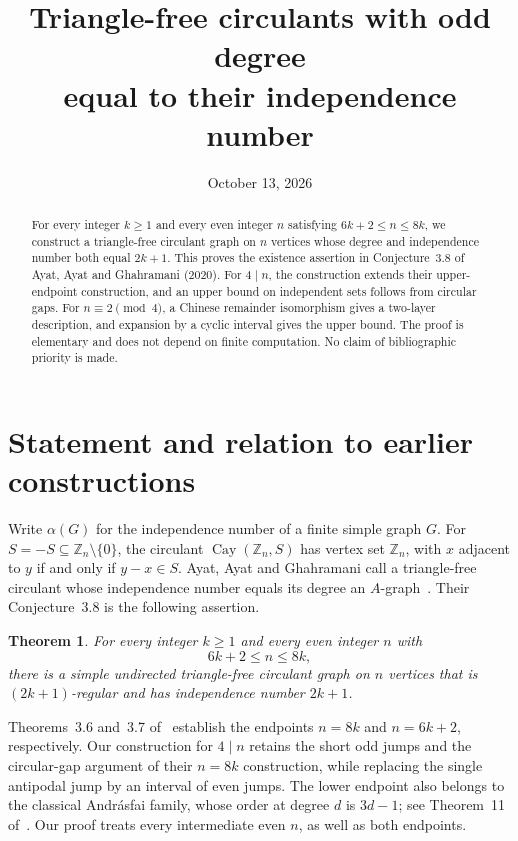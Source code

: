 \documentclass[11pt]{article}
\title{Triangle-free circulants with odd degree\\equal to their independence number}
\author{}
\date{October 13, 2026}
\newtheorem{theorem}{Theorem}
\newcommand{\Z}{\mathbb Z}
\newcommand{\Cay}{\operatorname{Cay}}
\begin{document}
\maketitle
\begin{abstract}
For every integer \(k\ge1\) and every even integer \(n\) satisfying
\(6k+2\le n\le8k\), we construct a triangle-free circulant graph on \(n\)
vertices whose degree and independence number both equal \(2k+1\).
This proves the existence assertion in Conjecture~3.8 of
Ayat, Ayat and Ghahramani (2020).
For \(4\mid n\), the construction extends their upper-endpoint construction,
and an upper bound on independent sets follows from circular gaps.
For \(n\equiv2\pmod4\), a Chinese remainder isomorphism gives a two-layer
description, and expansion by a cyclic interval gives the upper bound.
The proof is elementary and does not depend on finite computation.
No claim of bibliographic priority is made.
\end{abstract}

\section{Statement and relation to earlier constructions}

Write \(\alpha(G)\) for the independence number of a finite simple graph \(G\).
For \(S=-S\subseteq\Z_n\setminus\{0\}\), the circulant
\(\Cay(\Z_n,S)\) has vertex set \(\Z_n\), with \(x\) adjacent to \(y\)
if and only if \(y-x\in S\).
Ayat, Ayat and Ghahramani call a triangle-free circulant whose independence
number equals its degree an \(A\)-graph~\cite{Ayat2020}.
Their Conjecture~3.8 is the following assertion.

\begin{theorem}\label{thm:main}
For every integer \(k\ge1\) and every even integer \(n\) with
\[
6k+2\le n\le8k,
\]
there is a simple undirected triangle-free circulant graph on \(n\) vertices
that is \((2k+1)\)-regular and has independence number \(2k+1\).
\end{theorem}

Theorems~3.6 and~3.7 of~\cite{Ayat2020} establish the endpoints \(n=8k\)
and \(n=6k+2\), respectively.
Our construction for \(4\mid n\) retains the short odd jumps and the
circular-gap argument of their \(n=8k\) construction, while replacing
the single antipodal jump by an interval of even jumps.
The lower endpoint also belongs to the classical Andr\'asfai family,
whose order at degree \(d\) is \(3d-1\); see
Theorem~11 of~\cite{Bickle2027}.
Our proof treats every intermediate even \(n\), as well as both endpoints.
\end{document}
